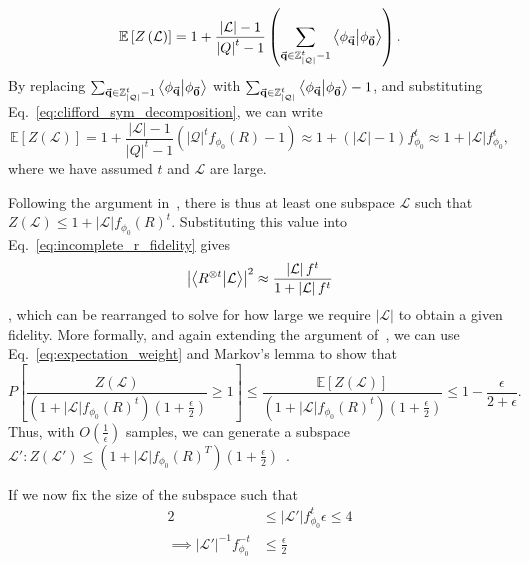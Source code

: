 \begin{equation}
\mathbb{E}\left[Z\left(\mathcal{L}\right)\right] = 1 + \frac{\left|\mathcal{L}\right|-1}{\left|Q\right|^{t}-1}\left(\sum_{\va{q}\in\mathbb{Z}_{\left|\mathcal{Q}\right|}^{t}-1}\braket{\phi_{\va{q}}}{\phi_{\va{0}}}\right).
\end{equation}
By replacing $\sum_{\va{q}\in\mathbb{Z}_{\left|\mathcal{Q}\right|}^{t}-1}\braket{\phi_{\va{q}}}{\phi_{\va{0}}}$ with $\sum_{\va{q}\in\mathbb{Z}_{\left|\mathcal{Q}\right|}^{t}}\braket{\phi_{\va{q}}}{\phi_{\va{0}}} -1$, and substituting Eq.~\ref{eq:clifford_sym_decomposition}, we can write
\begin{equation}
\mathbb{E}\left[Z\left(\mathcal{L}\right)\right] = 1 + \frac{\left|\mathcal{L}\right|-1}{\left|Q\right|^{t}-1}\left(\left|\mathcal{Q}\right|^{t}f_{\phi_{0}}\left(R\right)-1\right)\approx 1+\left(\left|\mathcal{L}\right|-1\right)f_{\phi_{0}}^{t}\approx 1+\left|\mathcal{L}\right|f_{\phi_{0}}^{t},
\label{eq:expectation_weight}
\end{equation}
where we have assumed $t$ and $\mathcal{L}$ are large.\par
Following the argument in~\cite{Bravyi2016}, there is thus at least one subspace $\mathcal{L}$ such that $Z\left(\mathcal{L}\right)\leq 1+\left|\mathcal{L}\right|f_{\phi_{0}}(R)^{t}$. Substituting this value into Eq.~\ref{eq:incomplete_r_fidelity} gives
\[
\left|\braket{R^{\otimes t}}{\mathcal{L}}\right|^{2} \approx \frac{\left|\mathcal{L}\right|f^{t}}{1+\left|\mathcal{L}\right|f^{t}}
\],
which can be rearranged to solve for how large we require $\left|\mathcal{L}\right|$ to obtain a given fidelity. More formally, and again extending the argument of~\cite{Bravyi2016}, we can use Eq.~\ref{eq:expectation_weight} and Markov's lemma to show that
\[P\left[ \frac{Z\left(\mathcal{L}\right)}{\left(1+\left|\mathcal{L}\right|f_{\phi_{0}}(R)^{t}\right)(1+\frac{\epsilon}{2})}\geq 1 \right] \leq \frac{\mathbb{E}\left[Z(\mathcal{L})\right]}{\left(1+\left|\mathcal{L}\right|f_{\phi_{0}}(R)^{t}\right)(1+\frac{\epsilon}{2})}\leq 1 - \frac{\epsilon}{2+\epsilon}.\]
Thus, with $O(\frac{1}{\epsilon})$ samples, we can generate a subspace $\mathcal{L'}:Z\left(\mathcal{L'}\right)\leq \left(1+\left|\mathcal{L}\right|f_{\phi_{0}}(R)^{T}\right)\left(1+\frac{\epsilon}{2}\right)$~\cite{Bravyi2016}.\par
If we now fix the size of the subspace such that
\begin{align*}
2&\leq \left|\mathcal{L'}\right|f_{\phi_{0}}^{t}\epsilon \leq 4 \\
\implies \left|\mathcal{L'}\right|^{-1}f_{\phi_{0}}^{-t}&\leq \frac{\epsilon}{2}
\end{align*}
